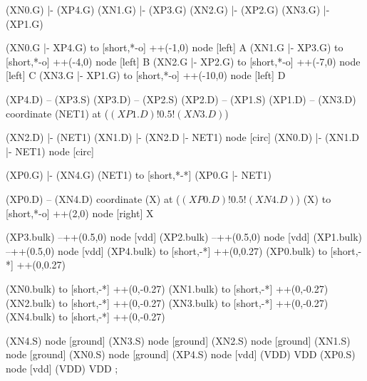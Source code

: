 \begin{circuitikz}[american]

	(XN0.G) |- (XP4.G)
	(XN1.G) |- (XP3.G)
	(XN2.G) |- (XP2.G)
	(XN3.G) |- (XP1.G)
	
	(XN0.G |- XP4.G) to [short,*-o] ++(-1,0) node [left] {A}
	(XN1.G |- XP3.G) to [short,*-o] ++(-4,0) node [left] {B}
	(XN2.G |- XP2.G) to [short,*-o] ++(-7,0) node [left] {C}
	(XN3.G |- XP1.G) to [short,*-o] ++(-10,0) node [left] {D}
	
	(XP4.D) -- (XP3.S)
	(XP3.D) -- (XP2.S)
	(XP2.D) -- (XP1.S)
	(XP1.D) -- (XN3.D)
	coordinate (NET1) at ($(XP1.D)!0.5!(XN3.D)$)	
	
	(XN2.D) |- (NET1)
	(XN1.D) |- (XN2.D |- NET1) node [circ] {}
	(XN0.D) |- (XN1.D |- NET1) node [circ] {}
	
	(XP0.G) |- (XN4.G)
	(NET1) to [short,*-*] (XP0.G |- NET1)
	
	(XP0.D) -- (XN4.D)
	coordinate (X) at ($(XP0.D)!0.5!(XN4.D)$)
	(X) to [short,*-o] ++(2,0) node [right] {X}
	
	(XP3.bulk) --++(0.5,0) node [vdd]{}
	(XP2.bulk) --++(0.5,0) node [vdd]{}
	(XP1.bulk) --++(0.5,0) node [vdd]{}
	(XP4.bulk) to [short,-*] ++(0,0.27)
	(XP0.bulk) to [short,-*] ++(0,0.27)
	
	(XN0.bulk) to [short,-*] ++(0,-0.27)
	(XN1.bulk) to [short,-*] ++(0,-0.27)
	(XN2.bulk) to [short,-*] ++(0,-0.27)
	(XN3.bulk) to [short,-*] ++(0,-0.27)
	(XN4.bulk) to [short,-*] ++(0,-0.27)


	(XN4.S) node [ground] {}
	(XN3.S) node [ground] {}
	(XN2.S) node [ground] {}
	(XN1.S) node [ground] {}
	(XN0.S) node [ground] {}
	(XP4.S) node [vdd] (VDD) {VDD}
	(XP0.S) node [vdd] (VDD) {VDD}
;

\end{circuitikz}
